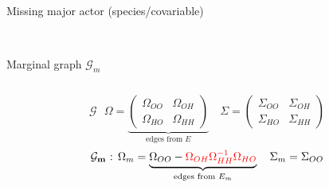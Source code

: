 \documentclass[9pt]{beamer}
\begin{document}
\begin{frame}{Missing major actor (species/covariable)}
\begin{columns}
\begin{column}{0.35\linewidth}
\begin{center}
\\


Marginal graph $\mathcal{G}_m$
\end{center}
\end{column}
\end{columns}
\vspace{0.2cm}
$$\mathbf{\mathcal{G}}\text{ }\Omega=\underbrace{\begin{pmatrix}
\Omega_{OO} & \Omega_{OH} \\ 
\Omega_{HO} & \Omega_{HH}
\end{pmatrix}}_{\text{edges from }E}  \quad \Sigma=\begin{pmatrix}
\Sigma_{OO} & \Sigma_{OH} \\ 
\Sigma_{HO} & \Sigma_{HH}
\end{pmatrix}$$
\vspace{0.4cm}
$$\mathbf{\mathcal{G}_m}\text{ : }\Omega_m= \underbrace{\Omega_{OO} - \color{red}\Omega_{OH}\Omega_{HH}^{-1}\Omega_{HO}}_{\text{edges from }E_m}\color{black} \quad \Sigma_m = \Sigma_{OO}$$

\end{frame}
\end{document}
